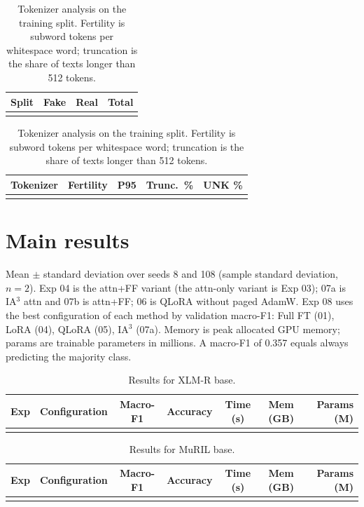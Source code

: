\documentclass[10pt,a4paper]{article}
\begin{document}
\begin{table}[H]
\centering\small
\begin{minipage}[t]{0.42\textwidth}\centering
\begin{tabular}{@{}lrrr@{}}
\toprule
Split & Fake & Real & Total \\
\midrule

\\
\bottomrule
\end{tabular}
\caption{Class distribution.}
\end{minipage}\hfill
\begin{minipage}[t]{0.56\textwidth}\centering
\begin{tabular}{@{}lrrrr@{}}
\toprule
Tokenizer & Fertility & P95 & Trunc.\ \% & UNK \% \\
\midrule

\\
\bottomrule
\end{tabular}
\caption{Tokenizer analysis on the training split. Fertility is subword tokens per whitespace word; truncation is the share of texts longer than 512 tokens.}
\end{minipage}
\end{table}

\section{Main results}
Mean $\pm$ standard deviation over seeds 8 and 108 (sample standard deviation, $n=2$). Exp 04 is the attn+FF variant (the attn-only variant is Exp 03); 07a is IA$^3$ attn and 07b is attn+FF; 06 is QLoRA without paged AdamW. Exp 08 uses the best configuration of each method by validation macro-F1: Full FT (01), LoRA (04), QLoRA (05), IA$^3$ (07a). Memory is peak allocated GPU memory; params are trainable parameters in millions. A macro-F1 of 0.357 equals always predicting the majority class.

\begin{table}[H]
\centering\footnotesize
\begin{tabular}{@{}llccccr@{}}
\toprule
Exp & Configuration & Macro-F1 & Accuracy & Time (s) & Mem (GB) & Params (M) \\
\midrule

\\
\bottomrule
\end{tabular}
\caption{Results for XLM-R base.}
\end{table}

\begin{table}[H]
\centering\footnotesize
\begin{tabular}{@{}llccccr@{}}
\toprule
Exp & Configuration & Macro-F1 & Accuracy & Time (s) & Mem (GB) & Params (M) \\
\midrule

\\
\bottomrule
\end{tabular}
\caption{Results for MuRIL base.}
\end{table}
\end{document}
